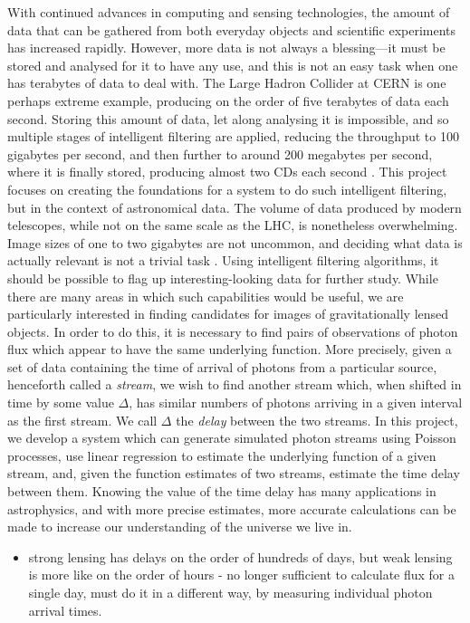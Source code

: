 \documentclass[a4paper,11pt]{article}
\begin{document}
With continued advances in computing and sensing technologies, the amount of
data that can be gathered from both everyday objects and scientific experiments
has increased rapidly. However, more data is not always a blessing---it must be
stored and analysed for it to have any use, and this is not an easy task when
one has terabytes of data to deal with. The Large Hadron Collider at CERN is one
perhaps extreme example, producing on the order of five terabytes of data each
second. Storing this amount of data, let along analysing it is impossible, and
so multiple stages of intelligent filtering are applied, reducing the throughput
to 100 gigabytes per second, and then further to around 200 megabytes per
second, where it is finally stored, producing almost two CDs each second
\cite{WLCGproc}. This project focuses on creating the foundations for a system
to do such intelligent filtering, but in the context of astronomical data. The
volume of data produced by modern telescopes, while not on the same scale as the
LHC, is nonetheless overwhelming. Image sizes of one to two gigabytes are not
uncommon, and deciding what data is actually relevant is not a trivial task
\cite{starck2002handbook}. Using intelligent filtering algorithms, it should be
possible to flag up interesting-looking data for further study. While there are
many areas in which such capabilities would be useful, we are particularly
interested in finding candidates for images of gravitationally lensed
objects. In order to do this, it is necessary to find pairs of observations of
photon flux which appear to have the same underlying function. More precisely,
given a set of data containing the time of arrival of photons from a particular
source, henceforth called a \emph{stream}, we wish to find another stream which,
when shifted in time by some value $\Delta$, has similar numbers of photons
arriving in a given interval as the first stream. We call $\Delta$ the
\emph{delay} between the two streams. In this project, we develop a system which
can generate simulated photon streams using Poisson processes, use linear
regression to estimate the underlying function of a given stream, and, given the
function estimates of two streams, estimate the time delay between them. Knowing
the value of the time delay has many applications in astrophysics, and with more
precise estimates, more accurate calculations can be made to increase our
understanding of the universe we live in.

\begin{itemize}
\item strong lensing has delays on the order of hundreds of days, but weak lensing
  is more like on the order of hours - no longer sufficient to calculate flux
  for a single day, must do it in a different way, by measuring individual
  photon arrival times.
\end{itemize}
\end{document}

